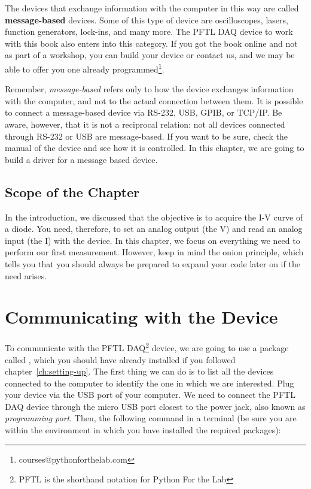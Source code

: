 The devices that exchange information with the computer in this way are called \textbf{message-based} devices. Some of this type of device are oscilloscopes, lasers, function generators, lock-ins, and many more. The {PFTL DAQ} device to work with this book also enters into this category. If you got the book online and not as part of a workshop, you can build your device or contact us, and we may be able to offer you one already programmed\footnote{courses@pythonforthelab.com}.


Remember, \textit{message-based} refers only to how the device exchanges information with the computer, and not to the actual connection between them. It is possible to connect a message-based device via RS-232, USB, GPIB, or TCP/IP. Be aware, however, that it is not a reciprocal relation: not all devices connected through RS-232 or USB are message-based. If you want to be sure, check the manual of the device and see how it is controlled. In this chapter, we are going to build a driver for a message based device.

\subsection{Scope of the Chapter}\label{subsec:scope-of-the-chapter}
In the introduction, we discussed that the objective is to acquire the I-V curve of a diode. You need, therefore, to set an analog output (the V) and read an analog input (the I) with the device. In this chapter, we focus
on everything we need to perform our first measurement. However, keep in mind the onion principle, which tells you that you should always be prepared to expand your code later on if the need arises.

\section{Communicating with the Device}\label{sec:message-basedevices}
To communicate with the {PFTL DAQ}\footnote{PFTL is the shorthand notation for Python For the Lab} device, we are going to use a package called , which you should have already installed if you followed chapter~\ref{ch:setting-up}. The first thing we can do is to list all the devices connected to the computer to identify the one in which we are interested. Plug your device via the USB port of your computer. We need to connect the {PFTL DAQ} device through the micro USB port closest to the power jack, also known as \emph{programming port}. Then, the following command in a terminal (be sure you are within the environment in which you have installed the required packages):

